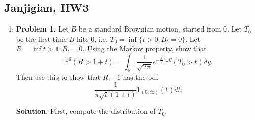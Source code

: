 \subsection{Janjigian, HW3}

\begin{enumerate}
    \item \textbf{Problem 1.} Let $B$ be a standard Brownian motion, started from $0$. Let $T_0$ be the first time $B$ hits $0$, i.e. $T_0 = \inf\{t > 0: B_t = 0\}$. Let $R = \inf{t > 1: B_t = 0}$. Using the Markov property, show that
    \begin{equation}
        \mathbb{P}^0(R > 1 + t) = \int_{\mathbb{R}} \frac{1}{\sqrt{2\pi}} e^{-\frac{y^2}{2}} 
        \mathbb{P}^y(T_0 > t) 
        dy.
    \end{equation}
    Then use this to show that $R - 1$ has the pdf
    \begin{equation}
        \frac{1}{\pi \sqrt{t} (1 + t)} 1_{(0, \infty)}(t) d t.
    \end{equation}

    \textbf{Solution.} First, compute the distribution of $T_0$.
        



\end{enumerate}